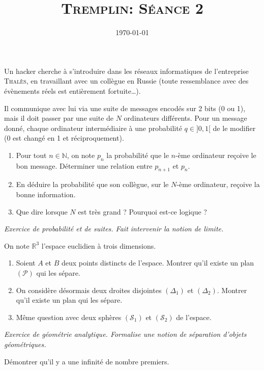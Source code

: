 \documentclass[12pt]{article}
\title{\textsc{Tremplin: Séance 2}}
\date{\today}
\author{}
\newcommand{\RR}{\mathbb R}
\newcommand{\NN}{\mathbb N}
\theoremstyle{definition}
\begin{document}
\maketitle

\begin{exer}
Un hacker cherche à s'introduire dans les réseaux informatiques de l'entreprise \textsc{Thalès}, en travaillant avec un collègue en Russie (toute ressemblance avec des évènements réels est entièrement fortuite\ldots).

Il communique avec lui via une suite de messages encodés sur 2 bits (0 ou 1), mais il doit passer par une  suite de $N$ ordinateurs différents. Pour un message donné, chaque ordinateur intermédiaire à une probabilité $q\in{]0,1[}$ de le modifier (0 est changé en 1 et réciproquement).
\begin{enumerate}
	\item Pour tout $n\in\NN$, on note $p_n$ la probabilité que le $n$-ème ordinateur reçoive le bon message. Déterminer une relation entre $p_{n+1}$ et $p_n$. 
	\item En déduire la probabilité que son collègue, sur le $N$-ème ordinateur, reçoive la bonne information.
	\item Que dire lorsque $N$ est très grand ? Pourquoi est-ce logique ?
\end{enumerate}
\end{exer}

\textit{Exercice de probabilité et de suites. Fait intervenir la notion de limite.}

\begin{exer}
On note $\RR^3$ l'espace euclidien à trois dimensions.
\begin{enumerate}
	\item Soient $A$ et $B$ deux points distincts de l'espace. Montrer qu'il existe un plan $(\mathcal{P})$ qui les sépare.
	\item On considère désormais deux droites disjointes $(\Delta_1)$ et $(\Delta_2)$. Montrer qu'il existe un plan qui les sépare.
	\item Même question avec deux sphères $(\mathcal S_1)$ et $(\mathcal S_2)$ de l'espace.
\end{enumerate}
\end{exer}

\textit{Exercice de géométrie analytique. Formalise une notion de séparation d'objets géométriques.}

\begin{exer}
	Démontrer qu'il y a une infinité de nombre premiers.
\end{exer}
\end{document}
